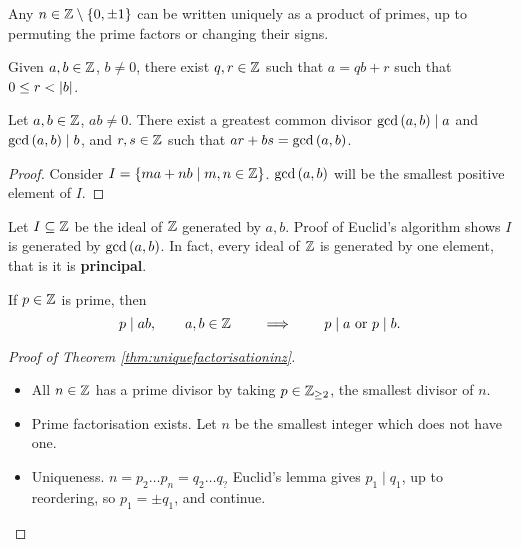 \begin{theorem}
\label{thm:uniquefactorisationinz}
Any $ n \in \mathbb{Z} \setminus \left\{ 0, \pm 1 \right\} $ can be written uniquely as a product of primes, up to permuting the prime factors or changing their signs.
\end{theorem}

\begin{proposition}
Given $ a, b \in \mathbb{Z} $, $ b \ne 0 $, there exist $ q, r \in \mathbb{Z} $ such that $ a = qb + r $ such that $ 0 \le r < \left\lvert b \right\rvert $.
\end{proposition}

\begin{proposition}
Let $ a, b \in \mathbb{Z} $, $ ab \ne 0 $. There exist a greatest common divisor $ \gcd\left( a, b \right) \mid a $ and $ \gcd\left( a, b \right) \mid b $, and $ r, s \in \mathbb{Z} $ such that $ ar + bs = \gcd\left( a, b \right) $.
\end{proposition}

\begin{proof}
Consider $ I = \left\{ ma + nb \mid m, n \in \mathbb{Z} \right\} $. $ \gcd\left( a, b \right) $ will be the smallest positive element of $ I $.
\end{proof}

Let $ I \subseteq \mathbb{Z} $ be the ideal of $ \mathbb{Z} $ generated by $ a, b $. Proof of Euclid's algorithm shows $ I $ is generated by $ \gcd\left( a, b \right) $. In fact, every ideal of $ \mathbb{Z} $ is generated by one element, that is it is \textbf{principal}.

\begin{proposition}
If $ p \in \mathbb{Z} $ is prime, then
$$ p \mid ab, \qquad a, b \in \mathbb{Z} \qquad \implies \qquad p \mid a \ \text{or} \ p \mid b. $$
\end{proposition}

\begin{proof}[Proof of Theorem \ref{thm:uniquefactorisationinz}]
\hfill
\begin{itemize}
\item All $ n \in \mathbb{Z} $ has a prime divisor by taking $ p \in \mathbb{Z}_{\ge 2} $, the smallest divisor of $ n $.
\item Prime factorisation exists. Let $ n $ be the smallest integer which does not have one.
\item Uniqueness. $ n = p_2 \dots p_n = q_2 \dots q_? $ Euclid's lemma gives $ p_1 \mid q_1 $, up to reordering, so $ p_1 = \pm q_1 $, and continue.
\end{itemize}
\end{proof}

